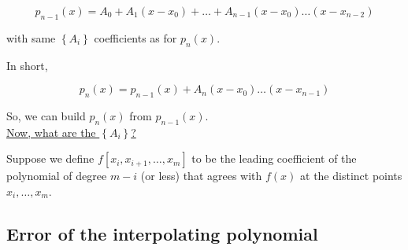 \begin{equation*}
    p_{n-1}(x) = A_0 + A_1(x-x_0) + \dots + A_{n-1}(x-x_0)\dots(x-x_{n-2})
\end{equation*}

with same $\left\{A_i\right\}$ coefficients as for $p_n(x)$. 

In short,

\begin{equation*}
    p_n(x) = p_{n-1}(x) + A_n(x-x_0)\dots(x-x_{n-1})
\end{equation*}

So, we can build $p_n(x)$ from $p_{n-1}(x)$. \\
 
\underline{Now, what are the $\left\{A_i\right\}$?} 

Suppose we define $f\left[x_i,x_{i+1},\dots,x_m\right]$ to be the leading coefficient of the polynomial of degree $m-i$ (or less) that agrees with $f(x)$ at the distinct points $x_i, \dots, x_m$.



\subsection{Error of the interpolating polynomial}

\begin{figure}
  \centering
  \label{}
  \caption{}
  
\end{figure}
\begin{figure}
  \centering
  \label{}
  \caption{}
  
\end{figure}
